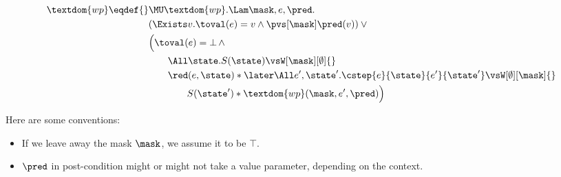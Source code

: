 \begin{align*}
  \textdom{wp} \eqdef{}& \MU \textdom{wp}. \Lam \mask, e, \pred. \\
        & (\Exists v. \toval(e) = v \land \pvs[\mask] \pred(v)) \lor {}\\
        & \Bigl(\toval(e) = \bot \,\land \\
        &\qquad \All \state. S(\state) \vsW[\mask][\emptyset] {}\\
        &\qquad \red(e, \state) * \later\All e', \state'. \cstep{e}{\state}{e'}{\state'} \vsW[\emptyset][\mask] {}\\
        &\qquad\qquad S(\state') * \textdom{wp}(\mask, e', \pred)\Bigr) \\
\end{align*}

Here are some conventions:

\begin{itemize}
\item If we leave away the mask $\mask$, we assume it to be $\top$.
\item $\pred$ in post-condition might or might not take a value parameter, depending on the context.
\end{itemize}

